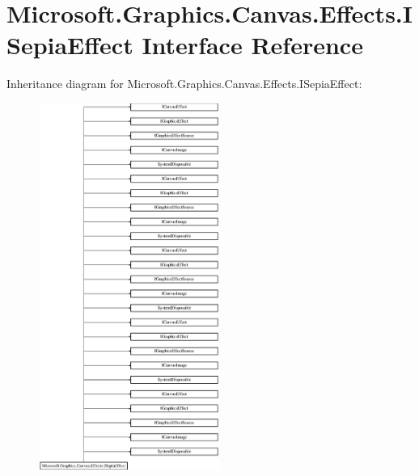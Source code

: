 \hypertarget{interface_microsoft_1_1_graphics_1_1_canvas_1_1_effects_1_1_i_sepia_effect}{}\section{Microsoft.\+Graphics.\+Canvas.\+Effects.\+I\+Sepia\+Effect Interface Reference}
\label{interface_microsoft_1_1_graphics_1_1_canvas_1_1_effects_1_1_i_sepia_effect}
Inheritance diagram for Microsoft.\+Graphics.\+Canvas.\+Effects.\+I\+Sepia\+Effect\+:\begin{figure}[H]
\begin{center}
\leavevmode
\includegraphics[height=12.000000cm]{interface_microsoft_1_1_graphics_1_1_canvas_1_1_effects_1_1_i_sepia_effect}
\end{center}
\end{figure}
